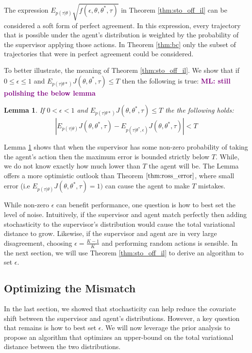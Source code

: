 \documentclass[conference]{article}
\newtheorem{lemma}[theorem]{Lemma}
\newcommand{\mlnote}[1]{\ifthenelse{ \boolean{include-notes}}%
 {\textcolor{purple}{\textbf{ML: #1}}}{}}
\begin{document}
The expression $  E_{p(\tau|\theta)}\sqrt{f(\epsilon,\theta,\theta^*,\tau)}$ in Theorem \ref{thm:sto_off_il} can be considered a soft form of perfect agreement. In this expression, every trajectory that is possible under the agent's distribution is weighted by the probability of the supervisor applying those actions. In Theorem \ref{thm:bc} only the subset of trajectories that were in perfect agreement could be considered. 

To better illustrate, the meaning of Theorem \ref{thm:sto_off_il}. We show that if $0 \leq \epsilon \leq 1$ and $E_{p(\tau|\theta*)} J(\theta,\theta^*,\tau) \leq T$ then the following is true: \mlnote{still polishing the below lemma}

\begin{lemma}\label{lmma:worst_case}
If $0 < \epsilon < 1$ and $E_{p(\tau|\theta*)} J(\theta,\theta^*,\tau) \leq T$ the the following holds: \\
$$|E_{p(\tau|\theta)} J(\theta,\theta^*,\tau)  - E_{p(\tau|\theta^*,\epsilon)} J(\theta,\theta^*,\tau) | < T$$

\end{lemma} 

Lemma \ref{lmma:worst_case} shows that when the supervisor has some non-zero probability of taking the agent's action then the maximum error is bounded strictly below $T$. While, we do not know exactly how much lower than $T$ the agent will be. The Lemma offers a more optimistic outlook than Theorem $\ref{thm:ross_error}$, where small error (i.e $E_{p(\tau|\theta)} J(\theta,\theta^*,\tau) = 1)$ can cause the agent to make $T$ mistakes. 


While non-zero $\epsilon$ can benefit performance, one question is how to best set the level of noise. Intuitively, if the supervisor and agent match perfectly then adding stochasticity to the supervisor's distribution would cause the total variational distance to grow. Likewise, if the supervisor and agent are in very large disagreement, choosing $\epsilon = \frac{K-1}{K}$ and performing random actions is sensible. In the next section, we will use Theorem \ref{thm:sto_off_il} to derive an algorithm to set $\epsilon$. 

\subsection{Optimizing the Mismatch}
In the last section, we showed that stochasticity can help reduce the covariate shift  between the supervisor and agent's distributions. However, a key question that remains is how to best set $\epsilon$. We will now leverage the prior analysis to propose an algorithm that optimizes an upper-bound on the total variational distance between the two distributions. 
\end{document}
